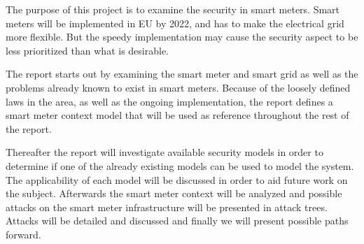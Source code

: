 The purpose of this project is to examine the security in smart meters.
Smart meters will be implemented in EU by 2022, and has to make the electrical grid more flexible.
But the speedy implementation may cause the security aspect to be less prioritized than what is desirable.

The report starts out by examining the smart meter and smart grid as well as the problems already known to exist in smart meters.
Because of the loosely defined laws in the area, as well as the ongoing implementation, the report defines a smart meter context model that will be used as reference throughout the rest of the report.

Thereafter the report will investigate available security models in order to determine if one of the already existing models can be used to model the system.
The applicability of each model will be discussed in order to aid future work on the subject.
Afterwards the smart meter context will be analyzed and possible attacks on the smart meter infrastructure will be presented in attack trees.
Attacks will be detailed and discussed and finally we will present possible paths forward.